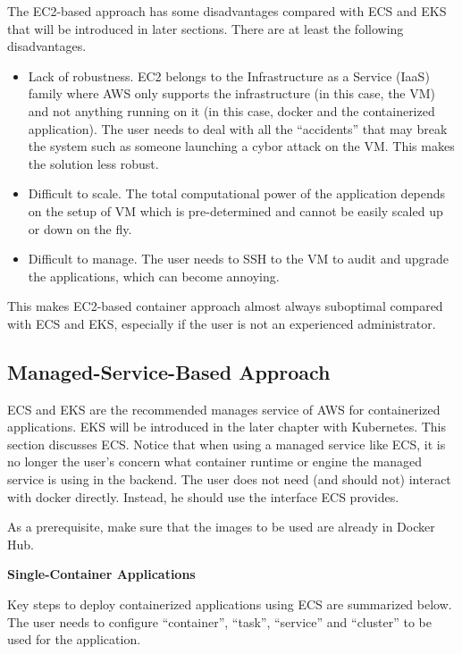 The EC2-based approach has some disadvantages compared with ECS and EKS that will be introduced in later sections. There are at least the following disadvantages.
\begin{itemize}
  \item Lack of robustness. EC2 belongs to the Infrastructure as a Service (IaaS) family where AWS only supports the infrastructure (in this case, the VM) and not anything running on it (in this case, docker and the containerized application). The user needs to deal with all the ``accidents'' that may break the system such as someone launching a cybor attack on the VM. This makes the solution less robust.
  \item Difficult to scale. The total computational power of the application depends on the setup of VM which is pre-determined and cannot be easily scaled up or down on the fly.
  \item Difficult to manage. The user needs to SSH to the VM to audit and upgrade the applications, which can become annoying.
\end{itemize}
This makes EC2-based container approach almost always suboptimal compared with ECS and EKS, especially if the user is not an experienced administrator.

\subsection{Managed-Service-Based Approach}

ECS and EKS are the recommended manages service of AWS for containerized applications. EKS will be introduced in the later chapter with Kubernetes. This section discusses ECS. Notice that when using a managed service like ECS, it is no longer the user's concern what container runtime or engine the managed service is using in the backend. The user does not need (and should not) interact with docker directly. Instead, he should use the interface ECS provides.

As a prerequisite, make sure that the images to be used are already in Docker Hub. 

\vspace{0.1in}
\noindent \textbf{Single-Container Applications}
\vspace{0.1in}

Key steps to deploy containerized applications using ECS are summarized below. The user needs to configure ``container'', ``task'', ``service'' and ``cluster'' to be used for the application.

